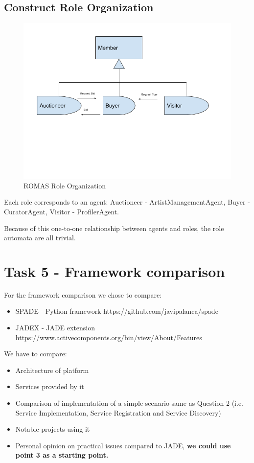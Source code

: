 \documentclass[a4paper, 11pt]{article}
\begin{document}
\subsection{Construct Role Organization}
\begin{figure}[H]
	\caption{ROMAS Role Organization}
	\centering
	\includegraphics[width=\textwidth]{./images/ROMASroleorganization.png}
\end{figure}

Each role corresponds to an agent: Auctioneer - ArtistManagementAgent, Buyer - CuratorAgent,
Visitor - ProfilerAgent.

Because of this one-to-one relationship between agents and roles, the role automata are all
trivial.

\clearpage

\section{Task 5 - Framework comparison}

For the framework comparison we chose to compare: 
\begin{itemize}
	\item SPADE - Python framework
	\subitem https://github.com/javipalanca/spade
	\item JADEX - JADE extension
	\subitem https://www.activecomponents.org/bin/view/About/Features
\end{itemize}

\noindent We have to compare:
\begin{itemize}
	\item Architecture of platform
	\item Services provided by it
	\item Comparison of implementation of a simple scenario	same as	Question 2 (i.e.	Service Implementation,	Service	Registration and Service Discovery)
	\item Notable projects using it
	\item Personal opinion on practical issues compared to JADE, \textbf{we could use point 3 as a starting point.}
\end{itemize}
\end{document}
